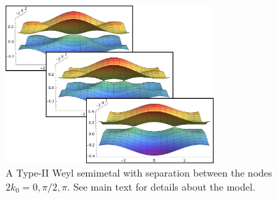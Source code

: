 \begin{figure}[ht]
  \centering
  \includegraphics[width=0.7\textwidth]{figures/movetypeiinode}
  \caption{\label{fig:typeii:move-nodes} A Type-II Weyl semimetal with separation between the nodes \(2k_{0} = 0, \pi/2, \pi \).
    See main text for details about the model.}
\end{figure}
